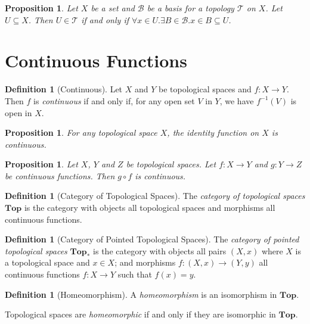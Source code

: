 \documentclass{book}
\newtheorem{proposition}[lemma]{Proposition}
\theoremstyle{definition}
\newtheorem{definition}[lemma]{Definition}
\newcommand{\BB}{\ensuremath{\mathcal{B}}}
\newcommand{\TT}{\ensuremath{\mathcal{T}}}
\newcommand{\inv}[1]{\ensuremath{{#1}^{-1}}}
\begin{document}
\begin{proposition}
    Let $X$ be a set and $\BB$ be a basis for a topology $\TT$ on $X$. Let $U \subseteq X$.
    Then $U \in \TT$ if and only if $\forall x \in U. \exists B \in \BB. x \in B \subseteq U$.
\end{proposition}

\section{Continuous Functions}

\begin{definition}[Continuous]
    Let $X$ and $Y$ be topological spaces and $f : X \rightarrow Y$. Then $f$ is \emph{continuous} if and only if, for any open set $V$
    in $Y$, we have $\inv{f}(V)$ is open in $X$.
\end{definition}

\begin{proposition}
    For any topological space $X$, the identity function on $X$ is continuous.
\end{proposition}

\begin{proposition}
    Let $X$, $Y$ and $Z$ be topological spaces. Let $f : X \rightarrow Y$ and $g : Y \rightarrow Z$ be continuous functions.
    Then $g \circ f$ is continuous.
\end{proposition}

\begin{definition}[Category of Topological Spaces]
    The \emph{category of topological spaces} $\mathbf{Top}$ is the category with objects all topological spaces and morphisms all
    continuous functions.
\end{definition}

\begin{definition}[Category of Pointed Topological Spaces]
    The \emph{category of pointed topological spaces} $\mathbf{Top}_*$ is the category with objects all pairs
    $(X,x)$ where $X$ is a topological space and $x \in X$; and morphisms $f : (X,x) \rightarrow (Y,y)$ all
    continuous functions $f : X \rightarrow Y$ such that $f(x) = y$.
\end{definition}

\begin{definition}[Homeomorphism]
    A \emph{homeomorphism} is an isomorphism in $\mathbf{Top}$.

    Topological spaces are \emph{homeomorphic} if and only if they are isomorphic in $\mathbf{Top}$.
\end{definition}
\end{document}
